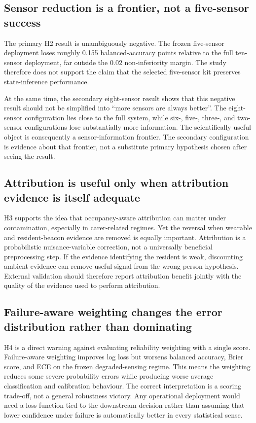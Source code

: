 \documentclass[11pt]{article}
\begin{document}
\subsection{Sensor reduction is a frontier, not a five-sensor success}

The primary H2 result is unambiguously negative. The frozen five-sensor deployment loses roughly 0.155 balanced-accuracy points relative to the full ten-sensor deployment, far outside the $0.02$ non-inferiority margin. The study therefore does not support the claim that the selected five-sensor kit preserves state-inference performance.

At the same time, the secondary eight-sensor result shows that this negative result should not be simplified into ``more sensors are always better''. The eight-sensor configuration lies close to the full system, while six-, five-, three-, and two-sensor configurations lose substantially more information. The scientifically useful object is consequently a sensor-information frontier. The secondary configuration is evidence about that frontier, not a substitute primary hypothesis chosen after seeing the result.

\subsection{Attribution is useful only when attribution evidence is itself adequate}

H3 supports the idea that occupancy-aware attribution can matter under contamination, especially in carer-related regimes. Yet the reversal when wearable and resident-beacon evidence are removed is equally important. Attribution is a probabilistic nuisance-variable correction, not a universally beneficial preprocessing step. If the evidence identifying the resident is weak, discounting ambient evidence can remove useful signal from the wrong person hypothesis. External validation should therefore report attribution benefit jointly with the quality of the evidence used to perform attribution.

\subsection{Failure-aware weighting changes the error distribution rather than dominating}

H4 is a direct warning against evaluating reliability weighting with a single score. Failure-aware weighting improves log loss but worsens balanced accuracy, Brier score, and ECE on the frozen degraded-sensing regime. This means the weighting reduces some severe probability errors while producing worse average classification and calibration behaviour. The correct interpretation is a scoring trade-off, not a general robustness victory. Any operational deployment would need a loss function tied to the downstream decision rather than assuming that lower confidence under failure is automatically better in every statistical sense.
\end{document}
